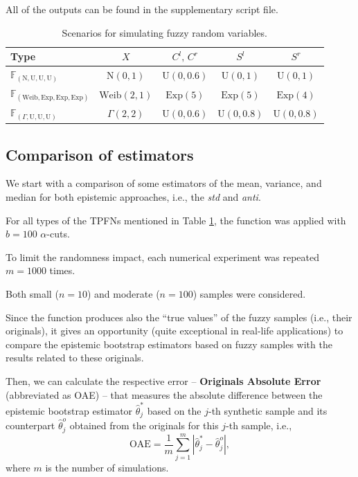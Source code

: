 All of the outputs can be found in the supplementary script file.

\begin{table}[htbp]
\centering
\begin{tabular}{l|cccc}
\hline 
 Type & $X$ & $C^l,\, C^r$ & $S^l$ &  $ S^r$   \\ 
\hline
$\mathbb{F}_{(\mathrm{N,U,U,U})}$ & $\mathrm{N}(0,1)$ & $\mathrm{U}(0,0.6)$ &  $\mathrm{U}(0,1)$ &  $\mathrm{U}(0,1)$  \\ 
$\mathbb{F}_{(\mathrm{Weib,Exp,Exp,Exp})}$ & $\mathrm{Weib} (2,1)$ &  $\mathrm{Exp}(5)$ & $\mathrm{Exp}(5)$ & $\mathrm{Exp}(4)$\\ 
$\mathbb{F}_{(\Gamma,\mathrm{U,U,U})}$ & $\Gamma (2,2)$ & $\mathrm{U}(0,0.6)$ &  $\mathrm{U}(0,0.8)$ &  $\mathrm{U}(0,0.8)$  \\ 
\hline
\end{tabular}
\caption{Scenarios for simulating fuzzy random variables.}\label{tab100}
\end{table}


\subsection{Comparison of estimators}

We start with a comparison of some estimators of the mean, variance, and median for both epistemic approaches, i.e., the \emph{std} and \emph{anti}.

For all types of the TPFNs mentioned in Table \ref{tab100}, the function  was applied with $b=100$ $\alpha$-cuts.

To limit the randomness impact, each numerical experiment was repeated $m=1000$ times.

Both small ($n=10$) and moderate ($n=100$) samples were considered.

Since the function  produces also the ``true values'' of the fuzzy samples (i.e., their originals), it gives an opportunity (quite exceptional in real-life applications) to compare the epistemic bootstrap estimators based on fuzzy samples with the results related to these originals.

Then, we can calculate the respective error -- \textbf{Originals Absolute Error} (abbreviated as OAE) -- that measures the absolute difference between the epistemic bootstrap estimator $\hat{\theta}^*_{j}$ based on the $j$-th synthetic sample and its counterpart $\hat{\theta}^o_{j}$ obtained from the originals for this $j$-th sample, i.e.,
\begin{equation}
    \text{OAE} = \frac{1}{m}\sum_{j=1}^{m} \left | \hat{\theta}^*_{j} - \hat{\theta}^o_{j} \right | ,
\end{equation}
where $m$ is the number of simulations.

